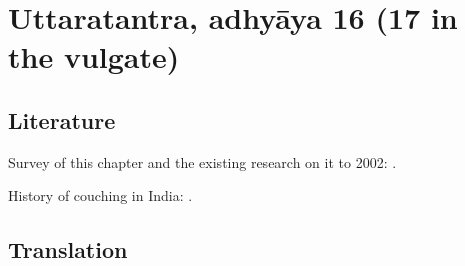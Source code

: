 \section{Uttaratantra, adhyāya 16 (17 in the vulgate)}

\subsection{Literature}

Survey of this chapter and the existing research 
on it to 2002: \cites[IA, 305--306]{meul-hist}.

History of couching in India: \cite{wujad-2019,
    desh-2000,
    desh-1999,
    bret-1826,
    leff-2020,
    shas-kaly,
    jack-1884,
    scot-1817,
    elli-1918,
    hend-1895}.


\subsection{Translation}

